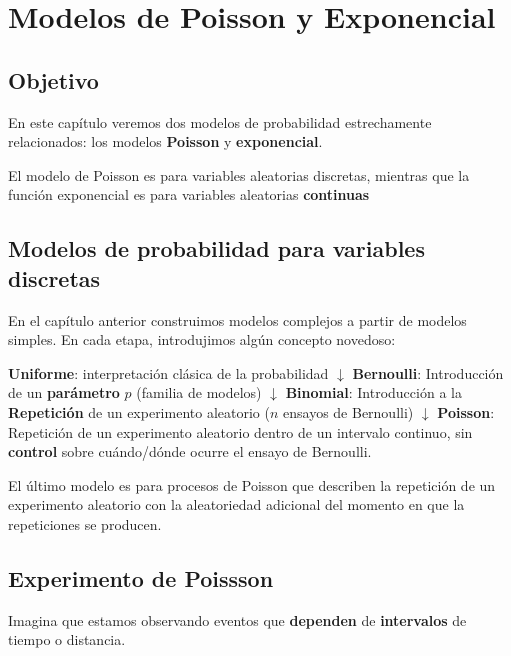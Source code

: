 \documentclass[
]{book}
\begin{document}
\hypertarget{modelos-de-poisson-y-exponencial}{%
\chapter{Modelos de Poisson y Exponencial}\label{modelos-de-poisson-y-exponencial}}

\hypertarget{objetivo-4}{%
\section{Objetivo}\label{objetivo-4}}

En este capítulo veremos dos modelos de probabilidad estrechamente relacionados: los modelos \textbf{Poisson} y \textbf{exponencial}.

El modelo de Poisson es para variables aleatorias discretas, mientras que la función exponencial es para variables aleatorias \textbf{continuas}

\hypertarget{modelos-de-probabilidad-para-variables-discretas}{%
\section{Modelos de probabilidad para variables discretas}\label{modelos-de-probabilidad-para-variables-discretas}}

En el capítulo anterior construimos modelos complejos a partir de modelos simples. En cada etapa, introdujimos algún concepto novedoso:

\textbf{Uniforme}: interpretación clásica de la probabilidad
\(\downarrow\)
\textbf{Bernoulli}: Introducción de un \textbf{parámetro} \(p\) (familia de modelos)
\(\downarrow\)
\textbf{Binomial}: Introducción a la \textbf{Repetición} de un experimento aleatorio (\(n\) ensayos de Bernoulli)
\(\downarrow\)
\textbf{Poisson}: Repetición de un experimento aleatorio dentro de un intervalo continuo, sin \textbf{control} sobre cuándo/dónde ocurre el ensayo de Bernoulli.

El último modelo es para procesos de Poisson que describen la repetición de un experimento aleatorio con la aleatoriedad adicional del momento en que la repeticiones se producen.

\hypertarget{experimento-de-poissson}{%
\section{Experimento de Poissson}\label{experimento-de-poissson}}

Imagina que estamos observando eventos que \textbf{dependen} de \textbf{intervalos} de tiempo o distancia.
\end{document}
